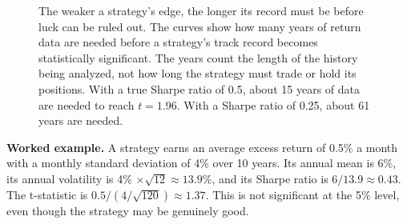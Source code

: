 \begin{figure}[!htbp]
  \centering
  \caption{The weaker a strategy's edge, the longer its record must be before luck can be ruled out. The curves show how many years of return data are needed before a strategy's track record becomes statistically significant. The years count the length of the history being analyzed, not how long the strategy must trade or hold its positions. With a true Sharpe ratio of 0.5, about 15 years of data are needed to reach $t = 1.96$. With a Sharpe ratio of 0.25, about 61 years are needed.}
  \label{fig:01-years}
\end{figure}



\textbf{Worked example.} A strategy earns an average excess return of 0.5\% a month with a monthly standard deviation of 4\% over 10 years. Its annual mean is 6\%, its annual volatility is 4\% $\times \sqrt{12} \approx 13.9$\%, and its Sharpe ratio is $6/13.9 \approx 0.43$. The t-statistic is $0.5 / (4/\sqrt{120}) \approx 1.37$. This is not significant at the 5\% level, even though the strategy may be genuinely good.



